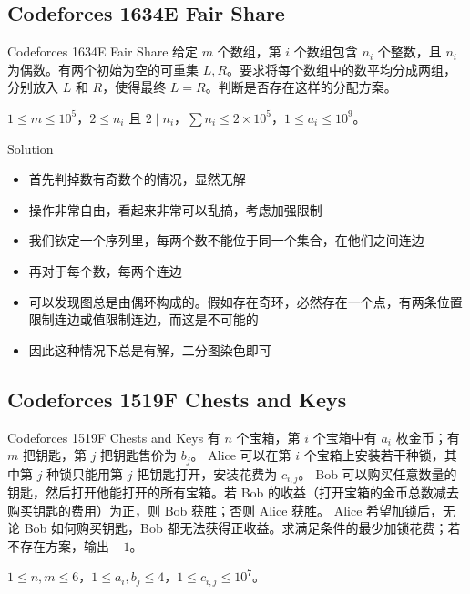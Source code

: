 ﻿\documentclass[aspectratio=169]{ctexbeamer}
\begin{document}
\subsection{Codeforces 1634E Fair Share}

\begin{frame}{Codeforces 1634E Fair Share}
    给定 $m$ 个数组，第 $i$ 个数组包含 $n_i$ 个整数，且 $n_i$ 为偶数。有两个初始为空的可重集 $L, R$。要求将每个数组中的数平均分成两组，分别放入 $L$ 和 $R$，使得最终 $L=R$。判断是否存在这样的分配方案。

    \medskip
    $1\le m\le 10^5$，$2\le n_i$ 且 $2\mid n_i$，$\sum n_i\le 2\times 10^5$，$1\le a_i\le 10^9$。
\end{frame}

\begin{frame}{Solution}
    \begin{itemize}
        \item 首先判掉数有奇数个的情况，显然无解
        \item 操作非常自由，看起来非常可以乱搞，考虑加强限制
        \item 我们钦定一个序列里，每两个数不能位于同一个集合，在他们之间连边
        \item 再对于每个数，每两个连边
        \item 可以发现图总是由偶环构成的。假如存在奇环，必然存在一个点，有两条位置限制连边或值限制连边，而这是不可能的
        \item 因此这种情况下总是有解，二分图染色即可
    \end{itemize}
\end{frame}

\subsection{Codeforces 1519F Chests and Keys}

\begin{frame}{Codeforces 1519F Chests and Keys}
    有 $n$ 个宝箱，第 $i$ 个宝箱中有 $a_i$ 枚金币；有 $m$ 把钥匙，第 $j$ 把钥匙售价为 $b_j$。
    Alice 可以在第 $i$ 个宝箱上安装若干种锁，其中第 $j$ 种锁只能用第 $j$ 把钥匙打开，安装花费为 $c_{i,j}$。
    Bob 可以购买任意数量的钥匙，然后打开他能打开的所有宝箱。若 Bob 的收益（打开宝箱的金币总数减去购买钥匙的费用）为正，则 Bob 获胜；否则 Alice 获胜。
    Alice 希望加锁后，无论 Bob 如何购买钥匙，Bob 都无法获得正收益。求满足条件的最少加锁花费；若不存在方案，输出 $-1$。
    
    \medskip
    $1\le n,m\le 6$，$1\le a_i,b_j\le 4$，$1\le c_{i,j}\le 10^7$。
\end{frame}
\end{document}
